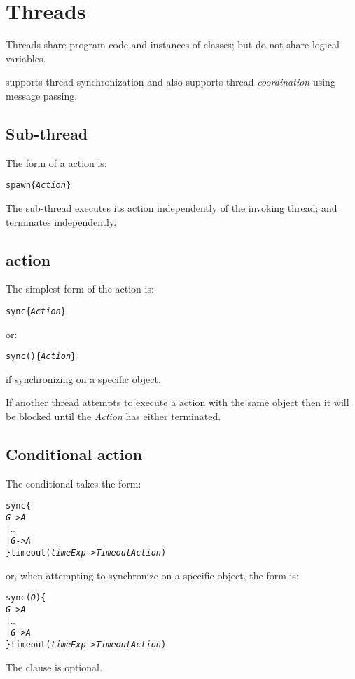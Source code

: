 \section{Threads}
\label{action:threads}

Threads share program code and instances of classes; but do not share logical variables.

\go supports thread synchronization and also supports thread \emph{coordination} using message passing.

\subsection{ Sub-thread}
\label{action:spawn}

The form of a  action is:
\begin{alltt}
spawn \{ \emph{Action} \}
\end{alltt}
The sub-thread executes its action independently of the invoking thread; and terminates independently.

\subsection{ action}
\label{action:sync}
The simplest form of the  action is:
\begin{alltt}
sync\{ \emph{Action} \}
\end{alltt}
or:
\begin{alltt}
sync()\{ \emph{Action} \}
\end{alltt}
if synchronizing on a specific object.

If another thread attempts to execute a  action with the same object then it will be blocked until the \emph{Action} has either terminated.

\subsection{Conditional  action}
\label{action:condsync}
The conditional  takes the form:
\begin{alltt}
sync\{
  \emph{G} -> \emph{A}
| \ldots
| \emph{G\subn} -> \emph{A\subn}
\} timeout (\emph{timeExp} -> \emph{TimeoutAction})
\end{alltt}
or, when attempting to synchronize on a specific object, the form is:
\begin{alltt}
sync(\emph{O})\{
  \emph{G} -> \emph{A}
| \ldots
| \emph{G\subn} -> \emph{A\subn}
\} timeout (\emph{timeExp} -> \emph{TimeoutAction})
\end{alltt}
The  clause is optional.

